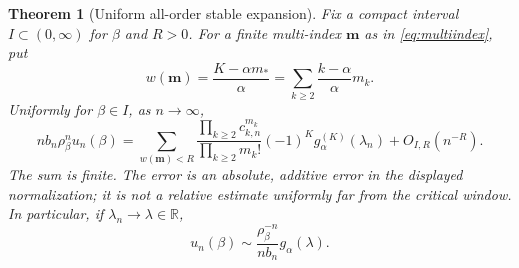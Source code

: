 \documentclass[11pt,a4paper]{article}
\numberwithin{equation}{section}
\newtheorem{theorem}{Theorem}[section]
\theoremstyle{definition}
\theoremstyle{remark}
\newcommand{\R}{\mathbb R}
\newcommand{\m}{\boldsymbol m}
\begin{document}
\begin{theorem}[Uniform all-order stable expansion]
\label{thm:allorders}
Fix a compact interval $I\subset(0,\infty)$ for $\beta$ and $R>0$. For a
finite multi-index $\m$ as in \eqref{eq:multiindex}, put
\begin{equation}\label{eq:weight}
 w(\m)=\frac{K-\alpha m_*}{\alpha}
       =\sum_{k\ge2}\frac{k-\alpha}{\alpha}m_k.
\end{equation}
Uniformly for $\beta\in I$, as $n\to\infty$,
\begin{equation}\label{eq:allorders}
 \boxed{\quad
 n b_n\rho_\beta^n u_n(\beta)
 =\sum_{w(\m)<R}
      \frac{\prod_{k\ge2}c_{k,n}^{m_k}}{\prod_{k\ge2}m_k!}
      (-1)^K g_\alpha^{(K)}(\lambda_n)
      +O_{I,R}(n^{-R}).\quad}
\end{equation}
The sum is finite. The error is an \emph{absolute, additive} error in the
displayed normalization; it is not a relative estimate uniformly far
from the critical window. In particular, if $\lambda_n\to\lambda\in\R$,
\begin{equation}\label{eq:leading-window}
 u_n(\beta)\sim\frac{\rho_\beta^{-n}}{n b_n}g_\alpha(\lambda).
\end{equation}
\end{theorem}
\end{document}
